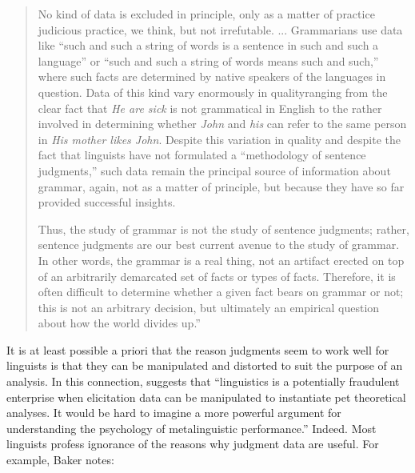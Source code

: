 \begin{quote}
No kind of data is excluded in principle, only as a matter of practice \schdash{} judicious practice, we think, but not irrefutable. ... Grammarians use data like ``such and such a string of words is a sentence in such and such a language'' or ``such and such a string of words means such and such,'' where such facts are determined by native speakers of the languages in question. Data of this kind vary enormously in quality\schdash{}ranging from the clear fact that \textit{He are sick} is not grammatical in English to the rather  involved in determining whether \textit{John} and \textit{his} can refer to the same person in \textit{His mother likes John}. Despite this variation in quality and despite the fact that linguists have not formulated a ``methodology of sentence judgments,'' such data remain the principal source of information about grammar, again, not as a matter of principle, but because they have so far provided successful insights.

Thus, the study of grammar is not the study of sentence judgments; rather, sentence judgments are our best current avenue to the study of grammar. In other words, the grammar is a real thing, not an artifact erected on top of an arbitrarily demarcated set of facts or types of facts. Therefore, it is often difficult to determine whether a given fact bears on grammar or not; this is not an arbitrary decision, but ultimately an empirical question about how the world divides up.''   \citep[2]{vanRiemsdijk1986}
\end{quote}

\noindent
It is at least possible a priori that the reason judgments seem to work well for linguists is that they can be manipulated and distorted to suit the purpose of an analysis. In this connection, \citep[82]{Birdsong1989} suggests that ``linguistics is a potentially fraudulent enterprise when elicitation data can be manipulated to instantiate pet theoretical analyses. It would be hard to imagine a more powerful argument for understanding the psychology of metalinguistic performance.'' Indeed. Most linguists profess ignorance of the reasons why judgment data are useful. For example, Baker notes:

